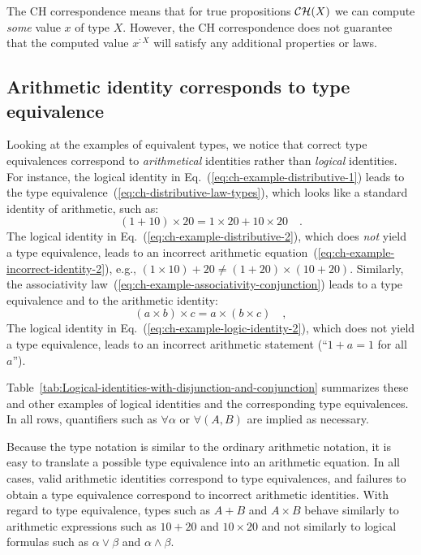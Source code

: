 The CH correspondence means that for true propositions ${\cal CH}(X)$
we can compute \emph{some} value $x$ of type $X$. However, the CH
correspondence does not guarantee that the computed value $x^{:X}$
will satisfy any additional properties or laws.

\subsection{Arithmetic identity corresponds to type equivalence}

Looking at the examples of equivalent types, we notice that correct
type equivalences correspond to \emph{arithmetical} identities rather
than \emph{logical} identities. For instance, the logical identity
in Eq.~(\ref{eq:ch-example-distributive-1}) leads to the type equivalence~(\ref{eq:ch-distributive-law-types}),
which looks like a standard identity of arithmetic, such as:
\[
(1+10)\times20=1\times20+10\times20\quad.
\]
The logical identity in Eq.~(\ref{eq:ch-example-distributive-2}),
which does \emph{not} yield a type equivalence, leads to an incorrect
arithmetic equation~(\ref{eq:ch-example-incorrect-identity-2}),
e.g., $\left(1\times10\right)+20\neq\left(1+20\right)\times\left(10+20\right)$.
Similarly, the associativity law~(\ref{eq:ch-example-associativity-conjunction})
leads to a type equivalence and to the arithmetic identity:
\[
\left(a\times b\right)\times c=a\times\left(b\times c\right)\quad,
\]
The logical identity in Eq.~(\ref{eq:ch-example-logic-identity-2}),
which does not yield a type equivalence, leads to an incorrect arithmetic
statement (\textsf{``}$1+a=1$ for all $a$\textsf{''}).

Table~\ref{tab:Logical-identities-with-disjunction-and-conjunction}
summarizes these and other examples of logical identities and the
corresponding type equivalences. In all rows, quantifiers such as
$\forall\alpha$ or $\forall(A,B)$ are implied as necessary.

Because the type notation is similar to the ordinary arithmetic notation,
it is easy to translate a possible type equivalence into an arithmetic
equation. In all cases, valid arithmetic identities correspond to
type equivalences, and failures to obtain a type equivalence correspond
to incorrect arithmetic identities. With regard to type equivalence,
types such as $A+B$ and $A\times B$ behave similarly to arithmetic
expressions such as $10+20$ and $10\times20$ and not similarly to
logical formulas such as $\alpha\vee\beta$ and $\alpha\wedge\beta$.

